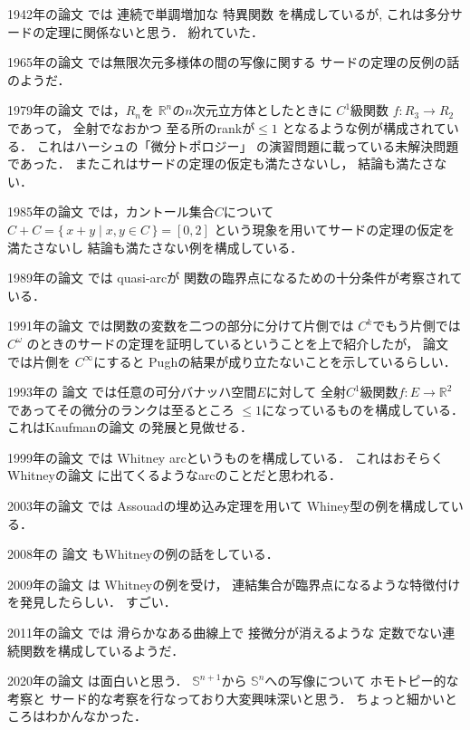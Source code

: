\documentclass[leqno, a4paper, 12pt]{jsarticle}
\newcommand{\rr}{\mathbb{R}}
\begin{document}
1942年の論文
\cite{MR0007929}
では
連続で単調増加な
特異関数
を構成しているが,
これは多分サードの定理に関係ないと思う．
紛れていた．


1965年の論文
\cite{MR0182024}
では無限次元多様体の間の写像に関する
サードの定理の反例の話のようだ．


1979年の論文
\cite{MR0600614}
では，$R_{n}$を
$\rr^{n}$の$n$次元立方体としたときに
$C^{1}$級関数
$f\colon R_{3}\to R_{2}$
であって，
全射でなおかつ
至る所のrankが$\le 1$
となるような例が構成されている．
これはハーシュの「微分トポロジー」
の演習問題に載っている未解決問題であった．
またこれはサードの定理の仮定も満たさないし，
結論も満たさない．



1985年の論文
\cite{MR0820057}
では，カントール集合$C$について
$C+C=\{\, x+y\mid x, y\in C\, \}=[0, 2]$
という現象を用いてサードの定理の仮定を満たさないし
結論も満たさない例を構成している．


1989年の論文
\cite{MR0969524}
では
quasi-arcが
関数の臨界点になるための十分条件が考察されている．



1991年の論文
\cite{MR1142720}
では関数の変数を二つの部分に分けて片側では
$C^{k}$でもう片側では
$C^{\omega}$
のときのサードの定理を証明しているということを上で紹介したが，
論文
\cite{MR1142725}
では片側を
$C^{\infty}$にすると
Pughの結果が成り立たないことを示しているらしい．

1993年の
論文
\cite{MR1217168}
では任意の可分バナッハ空間$E$に対して
全射$C^{1}$級関数$f\colon E\to \rr^{2}$
であってその微分のランクは至るところ
$\le1$になっているものを構成している．
これはKaufmanの論文
\cite{MR0600614}
の発展と見做せる．

1999年の論文
\cite{MR1694403}
では
Whitney arcというものを構成している．
これはおそらくWhitneyの論文
\cite{MR1545896}に出てくるようなarcのことだと思われる．

2003年の論文
\cite{MR1991757}
では
Assouadの埋め込み定理を用いて
Whiney型の例を構成している．



2008年の
論文
\cite{MR2399495}
もWhitneyの例の話をしている．


2009年の論文
\cite{MR2581221}
は
Whitneyの例を受け，
連結集合が臨界点になるような特徴付けを発見したらしい．
すごい．


2011年の論文
\cite{MR2894520}
では
滑らかなある曲線上で
接微分が消えるような
定数でない連続関数を構成しているようだ．


2020年の論文
\cite{MR4172678}
は面白いと思う．
$\mathbb{S}^{n+1}$から
$\mathbb{S}^{n}$への写像について
ホモトピー的な考察と
サード的な考察を行なっており大変興味深いと思う．
ちょっと細かいところはわかんなかった．
\end{document}
